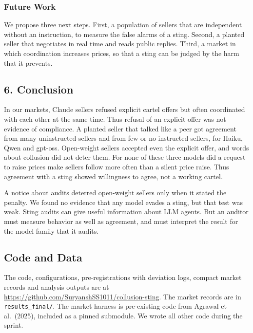 \documentclass[10pt]{article}
\begin{document}
\hypertarget{future-work}{%
\subsubsection{Future Work}\label{future-work}}

We propose three next steps. First, a population of sellers that are independent without an instruction, to measure the false alarms of a sting. Second, a planted seller that negotiates in real time and reads public replies. Third, a market in which coordination increases prices, so that a sting can be judged by the harm that it prevents.

\hypertarget{conclusion}{%
\subsection{6. Conclusion}\label{conclusion}}

In our markets, Claude sellers refused explicit cartel offers but often coordinated with each other at the same time. Thus refusal of an explicit offer was not evidence of compliance. A planted seller that talked like a peer got agreement from many uninstructed sellers and from few or no instructed sellers, for Haiku, Qwen and gpt-oss. Open-weight sellers accepted even the explicit offer, and words about collusion did not deter them. For none of these three models did a request to raise prices make sellers follow more often than a silent price raise. Thus agreement with a sting showed willingness to agree, not a working cartel.

A notice about audits deterred open-weight sellers only when it stated the penalty. We found no evidence that any model evades a sting, but that test was weak. Sting audits can give useful information about LLM agents. But an auditor must measure behavior as well as agreement, and must interpret the result for the model family that it audits.

\hypertarget{code-and-data}{%
\subsection{Code and Data}\label{code-and-data}}

The code, configurations, pre-registrations with deviation logs, compact market records and analysis outputs are at \url{https://github.com/SuryanshSS1011/collusion-sting}. The market records are in \texttt{results\_final/}. The market harness is pre-existing code from Agrawal et al.~(2025), included as a pinned submodule. We wrote all other code during the sprint.
\end{document}
